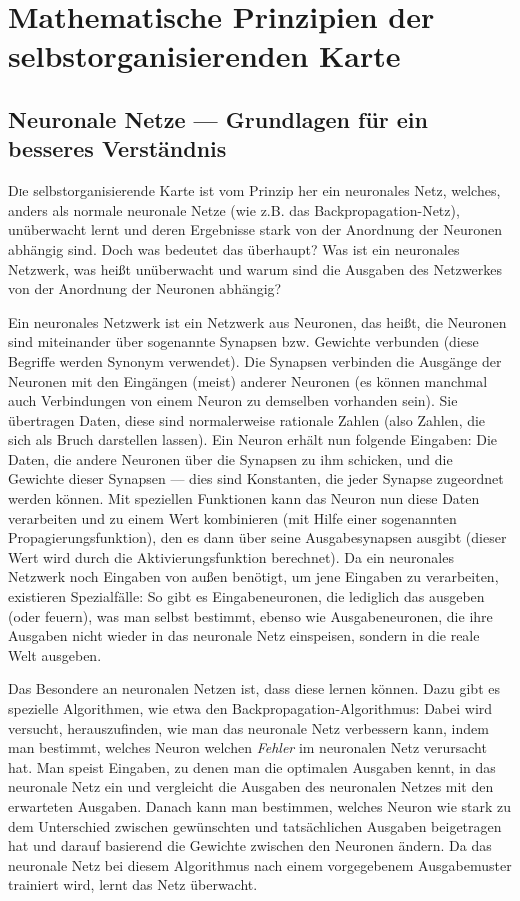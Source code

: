 \documentclass[twoside,a4paper]{article}
\newcommand{\commonlettrine}[1]{\lettrine[nindent=0em,lines=2]{#1}}
\begin{document}
\section{Mathematische Prinzipien der selbstorganisierenden Karte}
\subsection{Neuronale Netze --- Grundlagen für ein besseres Verständnis}

\commonlettrine{D}ie selbstorganisierende Karte ist vom Prinzip her ein neuronales Netz, welches, anders als \glqq{}normale\grqq{} neuronale Netze (wie z.B. das Backpropagation-Netz), unüberwacht lernt und deren Ergebnisse stark von der Anordnung der Neuronen abhängig sind. Doch was bedeutet das überhaupt? Was ist ein neuronales Netzwerk, was heißt \glqq{}unüberwacht\grqq{} und warum sind die Ausgaben des Netzwerkes von der Anordnung der Neuronen abhängig?

Ein neuronales Netzwerk ist ein Netzwerk aus Neuronen, das heißt, die Neuronen sind miteinander über sogenannte Synapsen bzw. Gewichte verbunden (diese Begriffe werden Synonym verwendet). Die Synapsen verbinden die Ausgänge der Neuronen mit den Eingängen (meist) anderer Neuronen (es können manchmal auch Verbindungen von einem Neuron zu demselben vorhanden sein). Sie übertragen Daten, diese sind normalerweise rationale Zahlen (also Zahlen, die sich als Bruch darstellen lassen). Ein Neuron erhält nun folgende Eingaben: Die Daten, die andere Neuronen über die Synapsen zu ihm schicken, und die \glqq{}Gewichte\grqq{} dieser Synapsen --- dies sind Konstanten, die jeder Synapse zugeordnet werden können. Mit speziellen Funktionen kann das Neuron nun diese Daten verarbeiten und zu einem Wert kombinieren (mit Hilfe einer sogenannten Propagierungsfunktion), den es dann über seine Ausgabesynapsen ausgibt (dieser Wert wird durch die Aktivierungsfunktion berechnet). Da ein neuronales Netzwerk noch Eingaben von außen benötigt, um jene Eingaben zu verarbeiten, existieren Spezialfälle: So gibt es Eingabeneuronen, die lediglich das ausgeben (oder \glqq{}feuern\grqq{}), was man selbst bestimmt, ebenso wie Ausgabeneuronen, die ihre Ausgaben nicht wieder in das neuronale Netz einspeisen, sondern in die reale Welt ausgeben.

Das Besondere an neuronalen Netzen ist, dass diese lernen können. Dazu gibt es spezielle Algorithmen, wie etwa den Backpropagation-Algorithmus: Dabei wird versucht, herauszufinden, wie man das neuronale Netz verbessern kann, indem man bestimmt, welches Neuron welchen \emph{Fehler} im neuronalen Netz verursacht hat. Man speist Eingaben, zu denen man die optimalen Ausgaben kennt, in das neuronale Netz ein und vergleicht die Ausgaben des neuronalen Netzes mit den erwarteten Ausgaben. Danach kann man bestimmen, welches Neuron wie stark zu dem Unterschied zwischen gewünschten und tatsächlichen Ausgaben beigetragen hat und darauf basierend die Gewichte zwischen den Neuronen ändern. Da das neuronale Netz bei diesem Algorithmus nach einem vorgegebenem Ausgabemuster trainiert wird, lernt das Netz \glqq{}überwacht\grqq{}.
\end{document}
